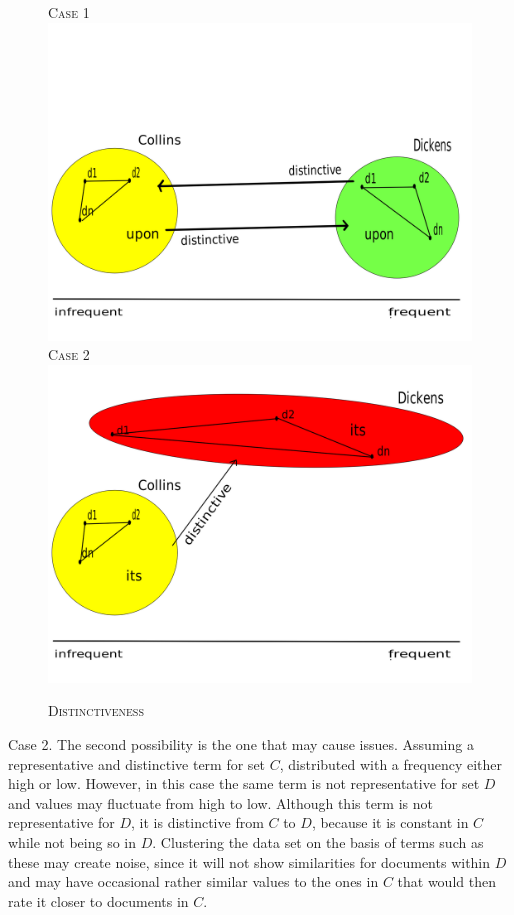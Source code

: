 \documentclass[a4paper,10pt,twoside,fleqn]{article}
\begin{document}
\begin{figure}
\caption{\textsc{Distinctiveness}}
{\scriptsize \textsc{Case 1}}\\
  \includegraphics[scale=0.2,width=\linewidth]{figures/distinc1-fin.png}
{\scriptsize \textsc{Case 2}}\\
  \includegraphics[scale=0.2,width=\linewidth]{figures/distinc2-fin.png}
\end{figure}


Case 2. The second possibility is the one that may cause issues.
Assuming a representative and distinctive term for set $C$, distributed with a
frequency either high or low.
However, in this case the same term is not representative for set $D$ and values
may fluctuate from high to low. Although this term is not representative
for $D$, it is distinctive from $C$ to $D$, because it is constant in $C$
while not being so in $D$.
Clustering the data set on the basis of terms such as these may create noise,
since it will not show similarities for documents within $D$ and
may have occasional rather similar values to the ones in $C$ that would
then rate it closer to documents in $C$.
\end{document}
